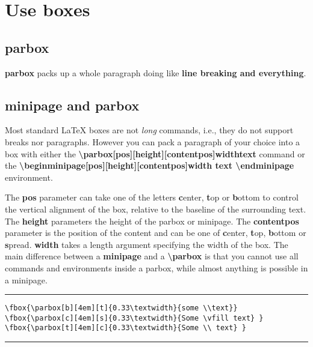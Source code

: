 

\section{Use boxes}
\subsection{parbox}
\textbf{parbox} packs up a whole paragraph doing like \textbf{line breaking and everything}.

\subsection{minipage and parbox}
Most standard \LaTeX{} boxes are not \textit{long} commands, i.e., they do not support breaks nor paragraphs. However you can pack a paragraph of your choice into a box with either the \textbf{\textbackslash parbox[pos][height][contentpos]{width}{text}} command or the \textbf{\textbackslash begin{minipage}[pos][height][contentpos]{width} text \textbackslash end{minipage}} environment.

The \textbf{pos} parameter can take one of the letters \textbf{c}enter, \textbf{t}op or \textbf{b}ottom to control the vertical alignment of the box, relative to the baseline of the surrounding text. The \textbf{height} parameters the height of the parbox or minipage. The \textbf{contentpos} parameter is the position of the content and can be one of \textbf{c}enter, \textbf{t}op, \textbf{b}ottom or \textbf{s}pread. \textbf{width} takes a length argument specifying the width of the box. The main difference between a \textbf{minipage} and a \textbf{\textbackslash parbox} is that you cannot use all commands and environments inside a parbox, while almost anything is possible in a minipage.

\noindent
{}

\noindent\vspace{1em}\hrule
\begin{verbatim}
\fbox{\parbox[b][4em][t]{0.33\textwidth}{some \\text}}
\fbox{\parbox[c][4em][s]{0.33\textwidth}{Some \vfill text} }
\fbox{\parbox[t][4em][c]{0.33\textwidth}{Some \\ text} }
\end{verbatim}
\noindent\hrule\vspace{1em}

